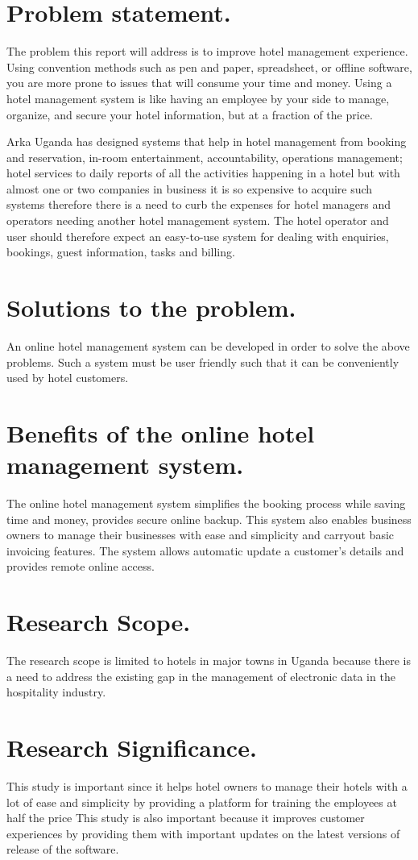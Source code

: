 \documentclass{article}
\begin{document}
\section{Problem statement.}
{The problem this report will address is to improve hotel management experience. Using convention methods such as pen and paper, spreadsheet, or offline software, you are more prone to issues that will consume your time and money. Using a hotel management system is like having an employee by your side to manage, organize, and secure your hotel information, but at a fraction of the price.

Arka Uganda has designed systems that help in hotel management from booking and reservation, in-room entertainment, accountability, operations management; hotel services to daily reports of all the activities happening in a hotel but with almost one or two companies in business it is so expensive to acquire such systems therefore there is a need to curb the expenses for hotel managers and operators needing another hotel management system.
The hotel operator and user should therefore expect an easy-to-use system for dealing with enquiries, bookings, guest information, tasks and billing.
}
\section{Solutions to the problem.}
{An online hotel management system can be developed in order to solve the above problems. Such a system must be user friendly such that it can be conveniently used by hotel customers. 
}
\section{Benefits of the online hotel management system.}
{ The online hotel management system simplifies the booking process while saving time and money,
 provides secure online backup.
 This system also enables business owners to manage their businesses with ease and simplicity and
 carryout basic invoicing features. The system allows automatic update a customer’s details and 
provides remote online access.
}
\section{Research Scope.}
{The research scope is limited to hotels in major towns in Uganda because there is a need to address the existing gap in the management of electronic data in the hospitality industry.}
\section{Research Significance.}
{This study is important since it helps hotel owners to manage their hotels with a lot of ease and simplicity by providing a platform for training the employees at half the price
This study is also important because it improves customer experiences by providing them with important updates on the latest versions of release of the software.
}
\end{document}
